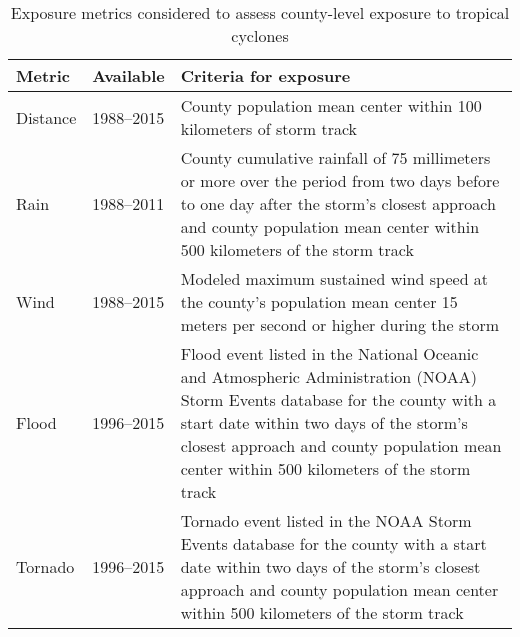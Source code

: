 \begin{table}%
\centering 
\caption{Exposure metrics considered to assess county-level exposure to 
tropical cyclones}
\begin{tabular}{p{0.9cm}p{2.5cm}p{9cm}} 
Metric & Available & Criteria for exposure \\ \midrule 
Distance & 1988--2015 & County population mean center within 100 kilometers of storm track \\ 
Rain & 1988--2011 & County cumulative rainfall of 75 millimeters or more over the period from two days before to one day after the storm's closest approach and county population mean center within 500 kilometers of the storm track \\ 
Wind & 1988--2015 & Modeled maximum sustained wind speed at the county's population mean center 15 meters per second or higher during the storm\\ 
Flood & 1996--2015 & Flood event listed in the National Oceanic and Atmospheric Administration (NOAA) Storm Events database for the county with a start date within two days of the storm's closest approach and county population mean center within 500 kilometers of the storm track \\
Tornado & 1996--2015 & Tornado event listed in the NOAA Storm Events database for the county with a start date within two days of the storm's closest approach and county population mean center within 500 kilometers of the storm track\\
\bottomrule 
\end{tabular} 
\label{tab:exposuremetrics} 
\end{table}
